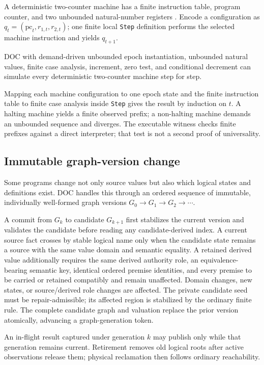A deterministic two-counter machine has a finite instruction table, program counter, and two unbounded natural-number registers \cite{minsky1967}. Encode a configuration as $q_t=(\mathrm{pc}_t,r_{1,t},r_{2,t})$; one finite local \texttt{Step} definition performs the selected machine instruction and yields $q_{t+1}$.
\begin{theorem}\label{thm:universal}
DOC with demand-driven unbounded epoch instantiation, unbounded natural values, finite case analysis, increment, zero test, and conditional decrement can simulate every deterministic two-counter machine step for step.
\end{theorem}
Mapping each machine configuration to one epoch state and the finite instruction table to finite case analysis inside \texttt{Step} gives the result by induction on $t$. A halting machine yields a finite observed prefix; a non-halting machine demands an unbounded sequence and diverges. The executable witness checks finite prefixes against a direct interpreter; that test is not a second proof of universality.

\subsection{Immutable graph-version change}
Some programs change not only source values but also which logical states and definitions exist. DOC handles this through an ordered sequence of immutable, individually well-formed graph versions $G_0\to G_1\to G_2\to\cdots$.

\begin{definition}\label{def:graphcommit}
A commit from $G_k$ to candidate $G_{k+1}$ first stabilizes the current version and validates the candidate before reading any candidate-derived index. A current source fact crosses by stable logical name only when the candidate state remains a source with the same value domain and semantic equality. A retained derived value additionally requires the same derived authority role, an equivalence-bearing semantic key, identical ordered premise identities, and every premise to be carried or retained compatibly and remain unaffected. Domain changes, new states, or source/derived role changes are affected. The private candidate seed must be repair-admissible; its affected region is stabilized by the ordinary finite rule. The complete candidate graph and valuation replace the prior version atomically, advancing a graph-generation token.
\end{definition}
An in-flight result captured under generation $k$ may publish only while that generation remains current. Retirement removes old logical roots after active observations release them; physical reclamation then follows ordinary reachability.

